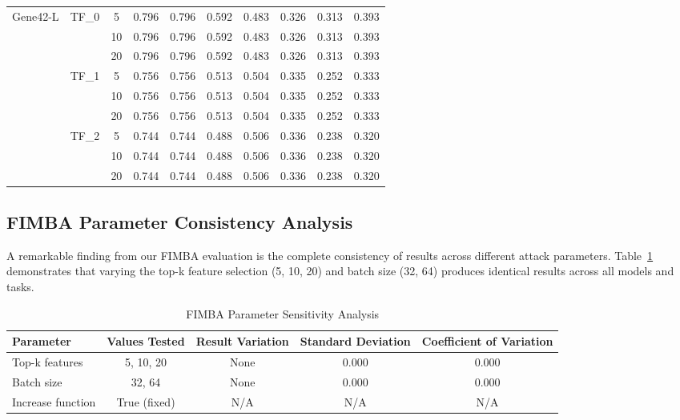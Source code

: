 \documentclass{article} %
\begin{document}
\begin{table}[h]
{\begin{tabular}{llcccccccc}
\midrule
\multirow{9}{*}{Gene42-L} & \multirow{3}{*}{TF\_0} & 5 & 0.796 & 0.796 & 0.592 & 0.483 & 0.326 & 0.313 & 0.393 \\
& & 10 & 0.796 & 0.796 & 0.592 & 0.483 & 0.326 & 0.313 & 0.393 \\
& & 20 & 0.796 & 0.796 & 0.592 & 0.483 & 0.326 & 0.313 & 0.393 \\
\cmidrule{2-10}
& \multirow{3}{*}{TF\_1} & 5 & 0.756 & 0.756 & 0.513 & 0.504 & 0.335 & 0.252 & 0.333 \\
& & 10 & 0.756 & 0.756 & 0.513 & 0.504 & 0.335 & 0.252 & 0.333 \\
& & 20 & 0.756 & 0.756 & 0.513 & 0.504 & 0.335 & 0.252 & 0.333 \\
\cmidrule{2-10}
& \multirow{3}{*}{TF\_2} & 5 & 0.744 & 0.744 & 0.488 & 0.506 & 0.336 & 0.238 & 0.320 \\
& & 10 & 0.744 & 0.744 & 0.488 & 0.506 & 0.336 & 0.238 & 0.320 \\
& & 20 & 0.744 & 0.744 & 0.488 & 0.506 & 0.336 & 0.238 & 0.320 \\
\bottomrule
\end{tabular}
}
\end{table}

\subsection{FIMBA Parameter Consistency Analysis}

A remarkable finding from our FIMBA evaluation is the complete consistency of results across different attack parameters. Table~\ref{tab:fimba_parameter_analysis} demonstrates that varying the top-k feature selection (5, 10, 20) and batch size (32, 64) produces identical results across all models and tasks.

\begin{table}[h]
\centering
\caption{FIMBA Parameter Sensitivity Analysis}
\label{tab:fimba_parameter_analysis}
\begin{tabular}{lcccc}
\toprule
\textbf{Parameter} & \textbf{Values Tested} & \textbf{Result Variation} & \textbf{Standard Deviation} & \textbf{Coefficient of Variation} \\
\midrule
Top-k features & 5, 10, 20 & None & 0.000 & 0.000 \\
Batch size & 32, 64 & None & 0.000 & 0.000 \\
Increase function & True (fixed) & N/A & N/A & N/A \\
\bottomrule
\end{tabular}
\end{table}
\end{document}

